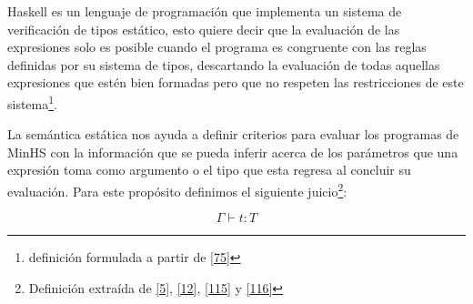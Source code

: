     \textsf{Haskell} es un lenguaje de programación que implementa un sistema de verificación de tipos estático, esto quiere decir que la evaluación de las expresiones solo es posible cuando el programa es congruente con las reglas definidas por su sistema de tipos, descartando la evaluación de todas aquellas expresiones que estén bien formadas pero que no respeten las restricciones de este sistema\footnote{definición formulada a partir de \hyperlink{75}{[75]}}. 


    \begin{definition}
       La semántica estática nos ayuda a definir criterios para evaluar los programas de \textsf{MinHS} con la información que se pueda inferir acerca de los parámetros que una expresión toma como argumento o el tipo que esta regresa al concluir su evaluación. Para este propósito definimos el siguiente juicio\footnote{Definición extraída de  \hyperlink{5}{[5]},  \hyperlink{12}{[12]}, \hyperlink{115}{[115]} y \hyperlink{116}{[116]}}:
    
    $$\Gamma\vdash t: T$$
    

\end{definition}
